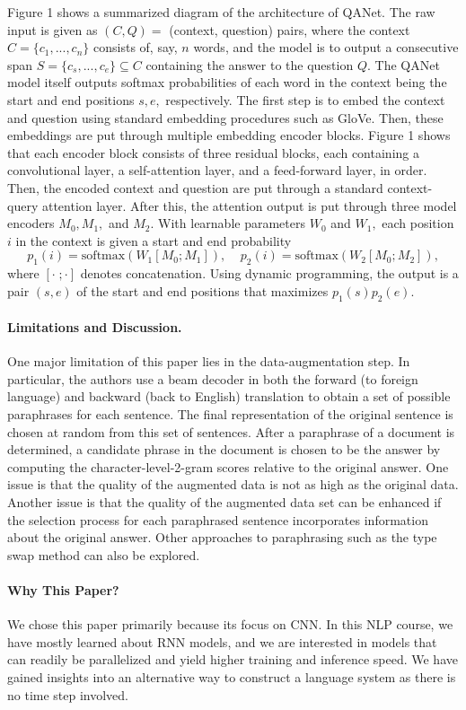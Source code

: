 \documentclass{article}
\begin{document}
Figure 1 shows a summarized diagram of the architecture of QANet. The raw input is given as $(C,Q)=$ (context, question) pairs, where the context $C=\{c_1,...,c_n\}$ consists of, say, $n$ words, and the model is to output a consecutive span $S=\{c_s,...,c_e\}\subseteq C$ containing the answer to the question $Q.$ The QANet model itself outputs softmax probabilities of each word in the context being the start and end positions $s,e,$ respectively. The first step is to embed the context and question using standard embedding procedures such as GloVe. Then, these embeddings are put through multiple embedding encoder blocks. Figure 1 shows that each encoder block consists of three residual blocks, each containing a convolutional layer, a self-attention layer, and a feed-forward layer, in order. Then, the encoded context and question are put through a standard context-query attention layer. After this, the attention output is put through three model encoders $M_0, M_1,$ and $M_2.$ With learnable parameters $W_0$ and $W_1,$ each position $i$ in the context is given a start and end probability
$$p_1(i)=\text{softmax}(W_1[M_0;M_1]),\;\;\;\; p_2(i)=\text{softmax}(W_2[M_0;M_2]),$$
where $[\cdot \;; \cdot]$ denotes concatenation. Using dynamic programming, the output is a pair $(s,e)$ of the start and end positions that maximizes $p_1(s)p_2(e).$

\paragraph{Limitations and Discussion.}
One major limitation of this paper lies in the data-augmentation step. In particular, the authors use a beam decoder in both the forward (to foreign language) and backward (back to English) translation to obtain a set of possible paraphrases for each sentence. The final representation of the original sentence is chosen at random from this set of sentences. After a paraphrase of a document is determined, a candidate phrase in the document is chosen to be the answer by computing the character-level-2-gram scores relative to the original answer. One issue is that the quality of the augmented data is not as high as the original data. Another issue is that the quality of the augmented data set can be enhanced if the selection process for each paraphrased sentence incorporates information about the original answer. Other approaches to paraphrasing such as the type swap method \cite{RM} can also be explored.


\paragraph{Why This Paper?}
We chose this paper primarily because its focus on CNN. In this NLP course, we have mostly learned about RNN models, and we are interested in models that can readily be parallelized and yield higher training and inference speed. We have gained insights into an alternative way to construct a language system as there is no time step involved. 
\end{document}
